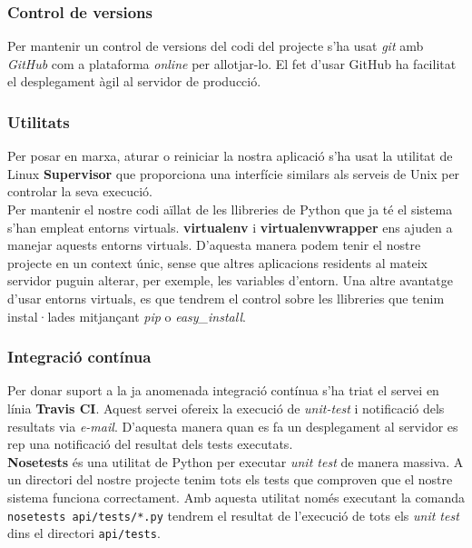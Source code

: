 	\subsubsection{Control de versions}
	Per mantenir un control de versions del codi del projecte s'ha usat \emph{git} \cite{git} amb \emph{GitHub} \cite{github} com a plataforma \emph{online} per allotjar-lo. El fet d'usar GitHub ha facilitat el desplegament àgil al servidor de producció.
	

	\subsubsection{Utilitats}

	Per posar en marxa, aturar o reiniciar la nostra aplicació s'ha usat la utilitat de Linux \textbf{Supervisor} \cite{supervisor} que proporciona una interfície similars als serveis de Unix per controlar la seva execució. \\

	Per mantenir el nostre codi aïllat de les llibreries de Python que ja té el sistema s'han empleat entorns virtuals. \textbf{virtualenv} \cite{virtualenv} i \textbf{virtualenvwrapper} \cite{virtualenvwrapper} ens ajuden a manejar aquests entorns virtuals. D'aquesta manera podem tenir el nostre projecte en un context únic, sense que altres aplicacions residents al mateix servidor puguin alterar, per exemple, les variables d'entorn. Una altre avantatge d'usar entorns virtuals, es que tendrem el control sobre les llibreries que tenim instal·lades mitjançant \emph{pip} o \emph{easy\_install}.\\

	\subsubsection{Integració contínua}

	Per donar suport a la ja anomenada integració contínua s'ha triat el servei en línia \textbf{Travis CI}. \cite{travis_ci} Aquest servei ofereix la execució de \emph{unit-test} i notificació dels resultats via \emph{e-mail}. D'aquesta manera quan es fa un desplegament al servidor es rep una notificació del resultat dels tests executats.\\
	
	\textbf{Nosetests} \cite{nose} és una utilitat de Python per executar \emph{unit test} de manera massiva. A un directori del nostre projecte tenim tots els tests que comproven que el nostre sistema funciona correctament. Amb aquesta utilitat només executant la comanda \texttt{nosetests api/tests/*.py} tendrem el resultat de l'execució de tots els \emph{unit test} dins el directori \texttt{api/tests}.\\
	
